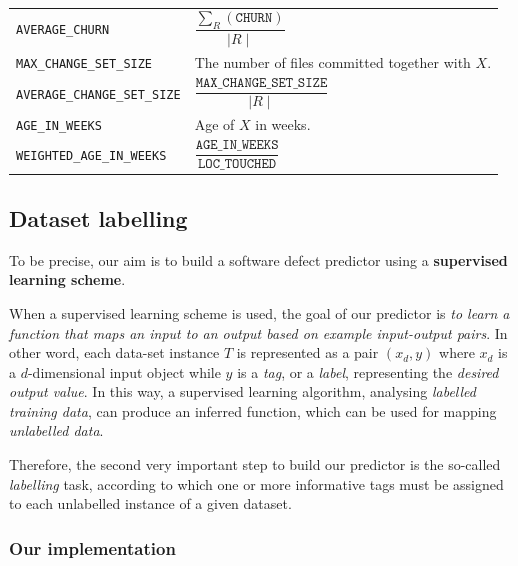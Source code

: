 \documentclass[sigconf]{acmart}
\begin{document}
\begin{table}
\begin{tabular}{l|p{4.3cm}}
\\

\texttt{AVERAGE\_CHURN} & $\dfrac{\sum_R (\texttt{CHURN})}{\mid R \mid}$

\\

\texttt{MAX\_CHANGE\_SET\_SIZE} & The number of files committed together with $X$.

\\

\texttt{AVERAGE\_CHANGE\_SET\_SIZE} & $\dfrac{\texttt{MAX\_CHANGE\_SET\_SIZE}}{\mid R \mid}$

\\

\texttt{AGE\_IN\_WEEKS} & Age of $X$ in weeks.

\\

\texttt{WEIGHTED\_AGE\_IN\_WEEKS} & $\dfrac{\texttt{AGE\_IN\_WEEKS}}{\texttt{LOC\_TOUCHED}}$

\\

\bottomrule
\end{tabular}
\end{table}

\subsection{Dataset labelling}

To be precise, our aim is to build a software defect predictor using a \textbf{supervised learning scheme}.

When a supervised learning scheme is used, the goal of our predictor is \textit{to learn a function that maps an input to an output based on example input-output pairs}. In other word, each data-set instance $T$ is represented as a pair $(x_{d}, y)$ where $x_d$ is a $d$-dimensional input object while $y$ is a \textit{tag}, or a \textit{label}, representing the \textit{desired output value}. In this way, a supervised learning algorithm, analysing \textit{labelled training data}, can produce an inferred function, which can be used for mapping \textit{unlabelled data}.

Therefore, the second very important step to build our predictor is the so-called \textit{labelling} task, according to which one or more informative tags must be assigned to each unlabelled instance of a given dataset.

\subsubsection{Our implementation}
\hfill\\
\end{document}
